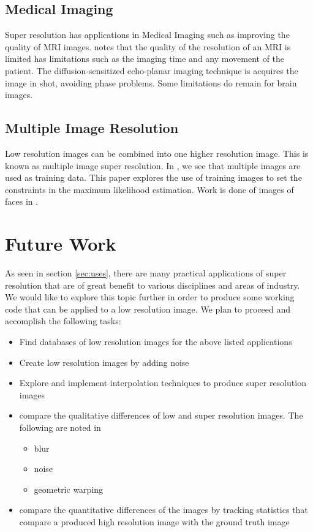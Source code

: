 \documentclass{article}
\begin{document}
\subsection{Medical Imaging}
Super resolution has applications in Medical Imaging such as improving
the quality of MRI images. \cite{Peled} notes that the quality of the resolution of
an MRI is limited has limitations such as the imaging time and any
movement of the patient. The diffusion-sensitized echo-planar imaging
technique is acquires the image in shot, avoiding phase problems. Some
limitations do remain for brain images.  


\subsection{Multiple Image Resolution}
Low resolution images can be combined into one higher resolution
image. This is known as multiple image super resolution. In
\cite{CapelMulti}, we see that multiple images are used as training
data. This paper explores the use of training images
to set the constraints in the maximum likelihood estimation. Work is done of images of faces in \cite{CapelMulti}.
 
\section{Future Work}
\label{sec:future}
As seen in section \ref{sec:uses}, there are many practical
applications of super resolution that are of great benefit to various
disciplines and areas of industry. We would like to explore this topic
further in order to produce some working code that can be applied to a low
resolution image. We plan to proceed and accomplish the following
tasks:
\begin{itemize}
\item Find databases of low resolution images for the
  above listed applications
  \item Create low resolution images by adding noise
  \item Explore and implement interpolation techniques to produce
    super resolution images
    \item compare the qualitative differences of low and super
      resolution images. The following are noted in \cite{CapelMulti}
      \begin{itemize}
      \item blur
      \item  noise
      \item geometric warping
        
        \end{itemize}
      \item compare the quantitative differences of the images by
        tracking statistics that compare a produced high resolution image with
        the ground truth image 
\end{itemize}


\newpage
\printbibliography
\end{document}
